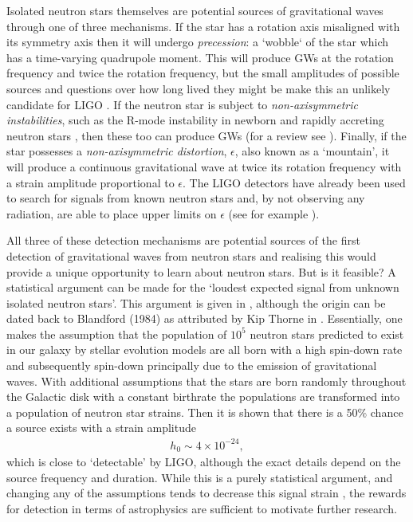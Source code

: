 Isolated neutron stars themselves are potential sources of gravitational waves
through one of three mechanisms. If the star has a rotation axis misaligned
with its symmetry axis then it will undergo \emph{precession}: a `wobble` of
the star which has a time-varying quadrupole moment. This will produce GWs at
the rotation frequency and twice the rotation frequency, but the small
amplitudes of possible sources and questions over how long lived they might be
make this an unlikely candidate for LIGO \citep{Jones2002}. If the neutron star
is subject to \emph{non-axisymmetric instabilities}, such as the R-mode
instability in newborn and rapidly accreting neutron stars
\citep{andersson2001r}, then these too can produce GWs (for a review see
\citet{andersson2003gravitational}).  Finally, if the star possesses a
\emph{non-axisymmetric distortion}, $\epsilon$, also known as a `mountain', it
will produce a continuous gravitational wave at twice its rotation frequency
with a strain amplitude proportional to $\epsilon$. The LIGO detectors have
already been used to search for signals from known neutron stars and, by not
observing any radiation, are able to place upper limits on $\epsilon$ (see for
example \citet{ligo2008, ligo2011}).

All three of these detection mechanisms are potential sources of the first
detection of gravitational waves from neutron stars and realising this would
provide a unique opportunity to learn about neutron stars. But is it feasible?
A statistical argument can be made for the `loudest expected signal from
unknown isolated neutron stars'. This argument is given in
\citet{abbott2007searches}, although the origin can be dated back to Blandford
(1984) as attributed by Kip Thorne in \citet{Hawking1989}. Essentially, one
makes the assumption that the population of $10^{5}$ neutron stars predicted to
exist in our galaxy by stellar evolution models are all born with a high
spin-down rate and subsequently spin-down principally due to the emission of
gravitational waves. With additional assumptions that the stars are born
randomly throughout the Galactic disk with a constant birthrate the populations
are transformed into a population of neutron star strains. Then it is shown
that there is a 50\% chance a source exists with a strain amplitude
\begin{align}
h_0 \sim 4 \times 10^{-24},
\end{align}
which is close to `detectable' by LIGO, although the exact details depend on the
source frequency and duration. While this is a purely statistical argument, and
changing any of the assumptions tends to decrease this signal strain
\citep{Prix2009}, the rewards for detection in terms of astrophysics are
sufficient to motivate further research.

